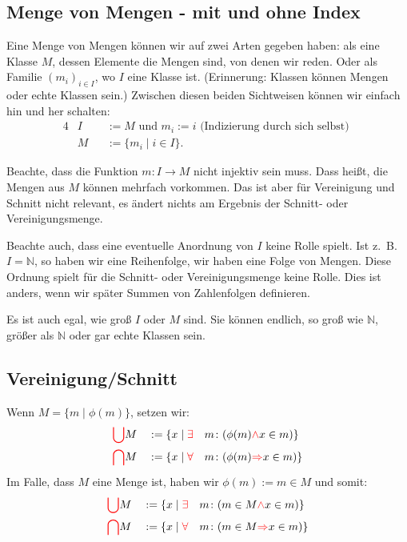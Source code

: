 \documentclass[a4paper]{amsart}
\theoremstyle{definition}
\newcommand{\N}{\ensuremath{\mathbb{ N }}}
\newcommand{\zb}{z.~B. }
\begin{document}
\subsection{Menge von Mengen - mit und ohne Index}
Eine Menge von Mengen können wir auf zwei Arten gegeben haben: als eine Klasse $M$, dessen Elemente die Mengen sind, von denen wir reden. Oder als Familie $(m_i)_{i \in I}$, wo $I$ eine Klasse ist. (Erinnerung: Klassen können Mengen oder echte Klassen sein.) Zwischen diesen beiden Sichtweisen können wir einfach hin und her schalten:
\begin{alignat}{4}
   &I &&:= M \text{ und } m_i := i \text{ (Indizierung durch sich selbst) }\\
   &M &&:= \{ m_i \mid i \in I \}.
\end{alignat}

Beachte, dass die Funktion $m \colon I \to M$ nicht injektiv sein muss. Dass heißt, die Mengen aus $M$ können mehrfach vorkommen. Das ist aber für Vereinigung und Schnitt nicht relevant, es ändert nichts am Ergebnis der Schnitt- oder Vereinigungsmenge.

Beachte auch, dass eine eventuelle Anordnung von $I$ keine Rolle spielt. Ist \zb $I = \N$, so haben wir eine Reihenfolge, wir haben eine Folge von Mengen. Diese Ordnung spielt für die Schnitt- oder Vereinigungsmenge keine Rolle. Dies ist anders, wenn wir später Summen von Zahlenfolgen definieren.

Es ist auch egal, wie groß $I$ oder $M$ sind. Sie können endlich, so groß wie $\N$, größer als $\N$ oder gar echte Klassen sein.

\subsection{Vereinigung/Schnitt}
Wenn $M = \{m \mid \phi( m )\}$, setzen wir:
\begin{alignat}{4}\label{Definition}
   &{\color{red} \bigcup} M &&:= \{ x \mid {\color{red}\exists} &&m \colon (\phi(m) {\color{red}\land} x \in m) \}\\
   &{\color{red} \bigcap} M &&:= \{ x \mid {\color{red}\forall} &&m \colon (\phi(m) {\color{red}\Rightarrow} x \in m) \}
\end{alignat}
Im Falle, dass $M$ eine Menge ist, haben wir $\phi(m) := m \in M$ und somit:
\begin{alignat}{4}\label{DefinitionMenge}
   &{\color{red} \bigcup} M &&:= \{ x \mid {\color{red}\exists} &&m \colon (m \in M {\color{red}\land} x \in m) \}\\
   &{\color{red} \bigcap} M &&:= \{ x \mid {\color{red}\forall} &&m \colon (m \in M {\color{red}\Rightarrow} x \in m) \}
\end{alignat}
\end{document}
